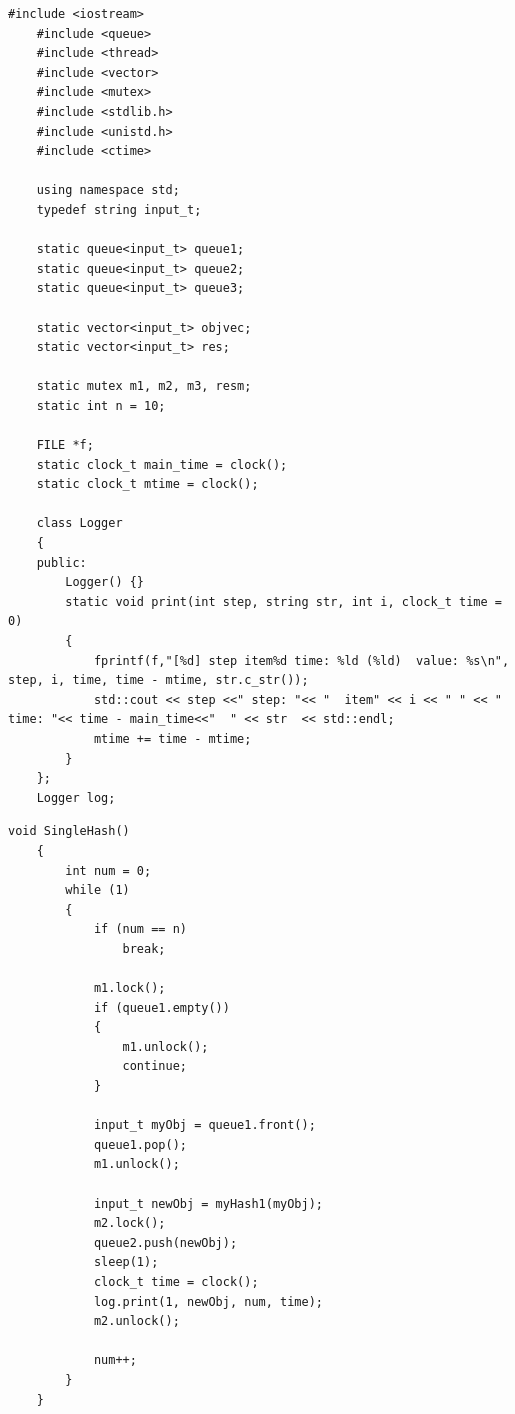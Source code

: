 \documentclass[a4paper,12pt]{report}
\begin{document}
	        \begin{lstlisting}[frame = single, label = list:help, breaklines, caption = Вспомогательные классы и объявления]
	#include <iostream>
	#include <queue>
	#include <thread>
	#include <vector>
	#include <mutex>
	#include <stdlib.h>
	#include <unistd.h>
	#include <ctime>
	        
	using namespace std;
	typedef string input_t;
	        
	static queue<input_t> queue1;
	static queue<input_t> queue2;
	static queue<input_t> queue3;
	        
	static vector<input_t> objvec;
	static vector<input_t> res;
	        
	static mutex m1, m2, m3, resm;
	static int n = 10;
	        
	FILE *f;
	static clock_t main_time = clock();
	static clock_t mtime = clock();
	        
	class Logger
	{
	public:
	    Logger() {}
	    static void print(int step, string str, int i, clock_t time = 0)
	    {
	    	fprintf(f,"[%d] step item%d time: %ld (%ld)  value: %s\n", step, i, time, time - mtime, str.c_str());
	        std::cout << step <<" step: "<< "  item" << i << " " << " time: "<< time - main_time<<"  " << str  << std::endl;
	        mtime += time - mtime;
	    }
	};
	Logger log; 
	        \end{lstlisting}
	        
	        \begin{lstlisting}[frame = single, breaklines, label = list:first, caption = Первая конвейерная лента]
	void SingleHash()
	{
	    int num = 0;
	    while (1)
	    {
	        if (num == n)
	            break;
	        
	        m1.lock();
	        if (queue1.empty())
	        {
	            m1.unlock();
	            continue;
	        }
	        
	        input_t myObj = queue1.front();
	        queue1.pop();
	        m1.unlock();
	        
	        input_t newObj = myHash1(myObj);
	        m2.lock();
	        queue2.push(newObj);
	        sleep(1);
	        clock_t time = clock();
	        log.print(1, newObj, num, time);
	        m2.unlock();
	        
	        num++;
	    }
	}
	        \end{lstlisting}
	        	
\end{document}
